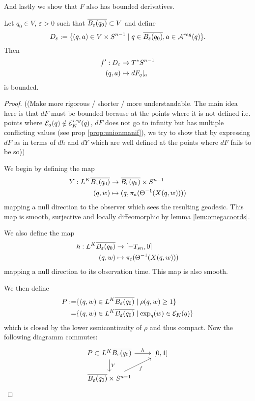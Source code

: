 And lastly we show that $F$ also has bounded derivatives.
\begin{proposition}\label{prop:dfbounded}
    Let $q_0\in V$, $\varepsilon>0$ such that ${\overline{B_\varepsilon(q_0)}}\subset V$ and define 
    \[
        D_\varepsilon:=\{(q,a)\in V\times {S^{n-1}} \mid q\in {\overline{B_\varepsilon(q_0)}}, a\in {{\mathcal{A}}^{reg}}(q)\}.
    \]
    Then 
    \begin{align*}
        f':D_\varepsilon &\to T^*{S^{n-1}} \\
        (q,a)&\mapsto dF_q\rvert_a
    \end{align*}
    is bounded.
\end{proposition}
\begin{proof}
    ((Make more rigorous / shorter / more understandable. The main idea here is that $dF$ must be bounded because at the points where it is not defined i.e. points where ${\mathcal{E}}_a(q)\notin {{\mathcal{E}}^{reg}_K}(q)$, $dF$ does not go to infinity but has multiple conflicting values (see prop \ref{prop:unionmanif}), we try to show that by expressing $dF$ as in terms of $dh$ and $dY$ which are well defined at the points where $dF$ fails to be so))

    We begin by defining the map
    \begin{align*}
        Y:L^K{\overline{B_\varepsilon(q_0)}}&\to {\overline{B_\varepsilon(q_0)}}\times {S^{n-1}} \\
        (q,w)&\mapsto (q,\pi_a(\Theta^{-1}(X(q,w))))
    \end{align*} mapping a null direction to the observer which sees the resulting geodesic. This map is smooth, surjective and locally diffeomorphic by lemma \ref{lem:omegacoords}.

    We also define the map
    \begin{align*}
        h:L^K{\overline{B_\varepsilon(q_0)}}&\to [-T_{sn},0] \\
        (q,w)&\mapsto \pi_t(\Theta^{-1}(X(q,w)))
    \end{align*} mapping a null direction to its observation time. This map is also smooth.

    We then define 
    \begin{align*}
        P:=& \{(q,w)\in L^K{\overline{B_\varepsilon(q_0)}} \mid \rho(q,w)\ge 1\}\\
        =& \{(q,w)\in L^K{\overline{B_\varepsilon(q_0)}} \mid \exp_q(w)\in {{\mathcal{E}}_K}(q)\}
    \end{align*} which is closed by the lower semicontinuity of $\rho$ and thus compact.
    Now the following diagramm commutes:
    \[\begin{tikzcd}
        {P\subset L^K\cl{B_\varepsilon(q_0)}} & {[0,1]} \\
        {\cl{B_\varepsilon(q_0)}\times S^{n-1}}
        \arrow["Y", from=1-1, to=2-1]
        \arrow["h", from=1-1, to=1-2]
        \arrow["f"', from=2-1, to=1-2]
    \end{tikzcd}\]


\end{proof}
